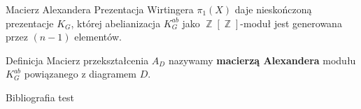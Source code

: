 \documentclass{beamer}
\DeclareMathOperator{\Z}{\mathbb{Z}}
\newenvironment{deff}{\begin{block}{Definicja}}{\end{block}}
\begin{document}
  \begin{frame}[fragile]{Macierz Alexandera}
    Prezentacja Wirtingera $\pi_1(X)$ daje nieskończoną prezentacje $K_G$, której abelianizacja $K_G^{ab}$ jako $\Z[\Z]$-moduł jest generowana przez $(n-1)$ elementów.
    \begin{center}
    \end{center}

    \begin{deff}
      Macierz przekształcenia $A_D$ nazywamy \textbf{macierzą Alexandera} modułu $K_G^{ab}$ powiązanego z diagramem $D$.
    \end{deff}

  \end{frame}
  
  \begin{frame}{Bibliografia}
    test
  \end{frame}
\end{document}
